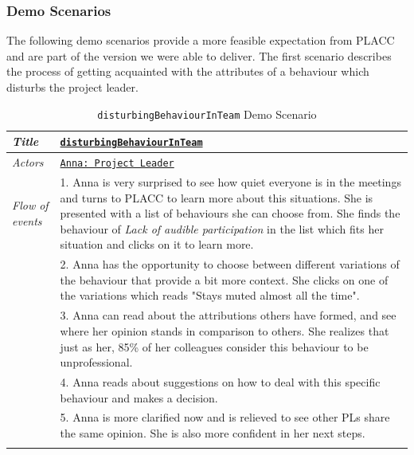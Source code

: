 \subsubsection{Demo Scenarios}


The following demo scenarios provide a more feasible expectation from PLACC and are part of the version we were able to deliver.  The first scenario describes the process of getting acquainted with the attributes of a behaviour which disturbs the project leader.

\begin{longtable}[ht]{ p{}  p{} }
\caption{\texttt{disturbingBehaviourInTeam} Demo Scenario}
\label{tab:disturbingBehaviourInTeam}\\
\hline
\textit{Title} & \underline{\texttt{disturbingBehaviourInTeam}}\\ [1.2ex]
    \hline
   \textit{Actors} & \underline{\texttt{Anna: Project Leader}} \\ [1.2ex]
   \hline
   \textit{Flow of events} &  1. Anna is very surprised to see how quiet everyone is in the meetings and turns to PLACC to learn more about this situations. She is presented with a list of behaviours she can choose from. She finds the behaviour of \textit{Lack of audible participation} in the list which fits her situation and clicks on it to learn more. \\
   & 2. Anna has the opportunity to choose between different variations of the behaviour that provide a bit more context. She clicks on one of the variations which reads "Stays muted almost all the time". \\
   & 3. Anna can read about the attributions others have formed, and see where her opinion stands in comparison to others.  She realizes that just as her, 85\% of her colleagues consider this behaviour to be unprofessional. \\
   & 4. Anna reads about suggestions on how to deal with this specific behaviour and makes a decision. \\
   & 5. Anna is more clarified now and is relieved to see other PLs share the same opinion. She is also more confident in her next steps.  \\
   \hline
\label{tab:multicol}
\end{longtable}

